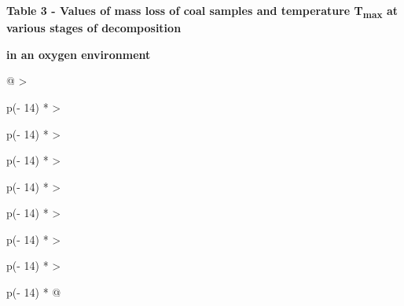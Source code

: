 \textbf{Table 3 - Values of mass loss of coal samples and temperature
T\textsubscript{max} at various stages of decomposition}

\textbf{in an oxygen environment}

\begin{longtable}[]{@{}
  >{\raggedright\arraybackslash}p{(\columnwidth - 14\tabcolsep) * }
  >{\raggedright\arraybackslash}p{(\columnwidth - 14\tabcolsep) * }
  >{\raggedright\arraybackslash}p{(\columnwidth - 14\tabcolsep) * }
  >{\raggedright\arraybackslash}p{(\columnwidth - 14\tabcolsep) * }
  >{\raggedright\arraybackslash}p{(\columnwidth - 14\tabcolsep) * }
  >{\raggedright\arraybackslash}p{(\columnwidth - 14\tabcolsep) * }
  >{\raggedright\arraybackslash}p{(\columnwidth - 14\tabcolsep) * }
  >{\raggedright\arraybackslash}p{(\columnwidth - 14\tabcolsep) * }@{}}
\toprule\noalign{}
\end{longtable}
